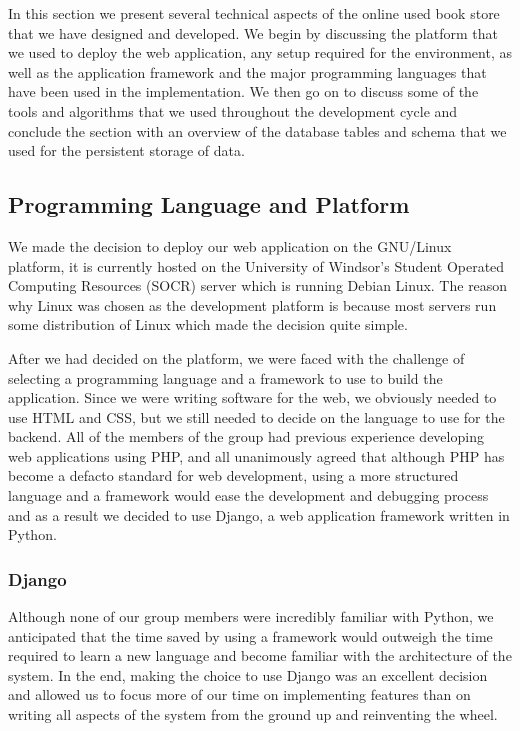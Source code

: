 \documentclass[11pt]{article}
\begin{document}
In this section we present several technical aspects of the online
used book store that we have designed and developed.  We begin by
discussing the platform that we used to deploy the web application,
any setup required for the environment, as well as the application
framework and the major programming languages that have been used in
the implementation. We then go on to discuss some of the tools and
algorithms that we used throughout the development cycle and conclude
the section with an overview of the database tables and schema that we
used for the persistent storage of data.

\subsection{Programming Language and Platform}
\label{sec:language-and-platform}

We made the decision to deploy our web application on the GNU/Linux
platform, it is currently hosted on the University of Windsor's
Student Operated Computing Resources (SOCR) server which is running
Debian Linux. The reason why Linux was chosen as the development
platform is because most servers run some distribution of Linux which
made the decision quite simple.

After we had decided on the platform, we were faced with the challenge
of selecting a programming language and a framework to use to build
the application. Since we were writing software for the web, we
obviously needed to use HTML and CSS, but we still needed to decide on
the language to use for the backend. All of the members of the group
had previous experience developing web applications using PHP, and all
unanimously agreed that although PHP has become a defacto standard for
web development, using a more structured language and a framework
would ease the development and debugging process and as a result we
decided to use Django, a web application framework written in Python.

\subsubsection{Django}
\label{sec:django}

Although none of our group members were incredibly familiar with
Python, we anticipated that the time saved by using a framework would
outweigh the time required to learn a new language and become familiar
with the architecture of the system. In the end, making the choice to
use Django was an excellent decision and allowed us to focus more of
our time on implementing features than on writing all aspects of the
system from the ground up and reinventing the wheel.
\end{document}
